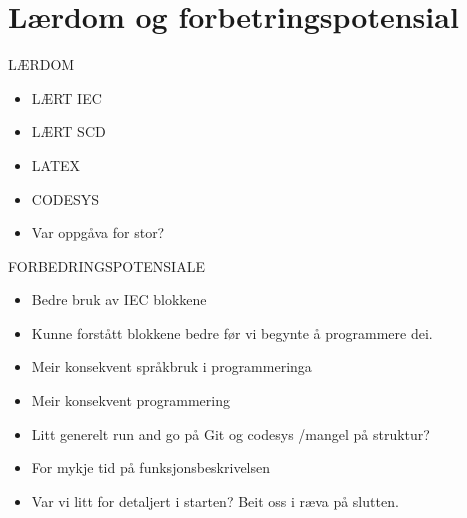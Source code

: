 \section{Lærdom og forbetringspotensial}
\thispagestyle{fancy}

LÆRDOM
\begin{itemize}
    \item LÆRT IEC
    \item LÆRT SCD
    \item LATEX
    \item CODESYS
    \item Var oppgåva for stor? 
\end{itemize}

FORBEDRINGSPOTENSIALE
\begin{itemize}
    \item Bedre bruk av IEC blokkene
    \item Kunne forstått blokkene bedre før vi begynte å programmere dei.
    \item Meir konsekvent språkbruk i programmeringa
    \item Meir konsekvent programmering
    \item Litt generelt run and go på Git og codesys /mangel på struktur?
    \item For mykje tid på funksjonsbeskrivelsen
    \item Var vi litt for detaljert i starten? Beit oss i ræva på slutten.
\end{itemize}
